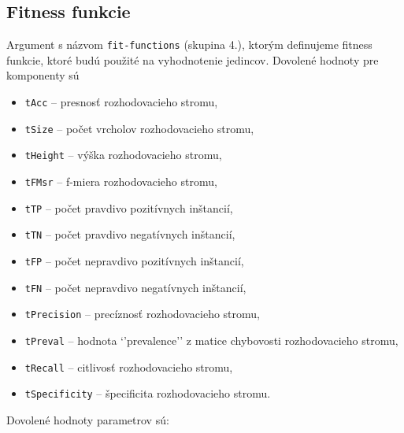 \subsection*{Fitness funkcie}
Argument s názvom \verb|fit-functions| (skupina 4.), ktorým definujeme fitness funkcie, ktoré budú použité na vyhodnotenie jedincov.
Dovolené hodnoty pre komponenty sú 
\begin{itemize}
\item \verb|tAcc| -- presnosť rozhodovacieho stromu,
\item \verb|tSize|  -- počet vrcholov rozhodovacieho stromu,
\item \verb|tHeight| -- výška rozhodovacieho stromu,
\item \verb|tFMsr| -- f-miera rozhodovacieho stromu,
\item \verb|tTP| -- počet pravdivo pozitívnych inštancií,
\item \verb|tTN| -- počet pravdivo negatívnych inštancií,
\item \verb|tFP| -- počet nepravdivo pozitívnych inštancií,
\item \verb|tFN| -- počet nepravdivo negatívnych inštancií,
\item \verb|tPrecision| -- precíznosť rozhodovacieho stromu,
\item \verb|tPreval| -- hodnota `'prevalence'' z matice chybovosti rozhodovacieho stromu,
\item \verb|tRecall| -- citlivosť rozhodovacieho stromu,
\item \verb|tSpecificity| -- špecificita rozhodovacieho stromu.
\end{itemize}

Dovolené hodnoty parametrov sú:


